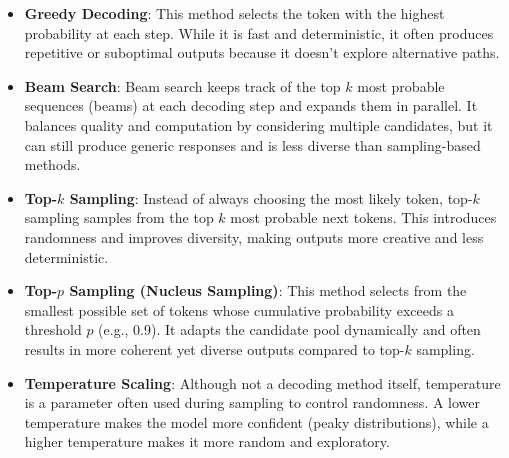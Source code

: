 \begin{itemize}
	\item \textbf{Greedy Decoding}: This method selects the token with the highest probability at each step. While it is fast and deterministic, it often produces repetitive or suboptimal outputs because it doesn't explore alternative paths.
	\item \textbf{Beam Search}: Beam search keeps track of the top \(k\) most probable sequences (beams) at each decoding step and expands them in parallel. It balances quality and computation by considering multiple candidates, but it can still produce generic responses and is less diverse than sampling-based methods.
	\item \textbf{Top-\(k\) Sampling}: Instead of always choosing the most likely token, top-\(k\) sampling samples from the top \(k\) most probable next tokens. This introduces randomness and improves diversity, making outputs more creative and less deterministic.
	\item \textbf{Top-\(p\) Sampling (Nucleus Sampling)}: This method selects from the smallest possible set of tokens whose cumulative probability exceeds a threshold \(p\) (e.g., 0.9). It adapts the candidate pool dynamically and often results in more coherent yet diverse outputs compared to top-\(k\) sampling.
	\item \textbf{Temperature Scaling}: Although not a decoding method itself, temperature is a parameter often used during sampling to control randomness. A lower temperature makes the model more confident (peaky distributions), while a higher temperature makes it more random and exploratory.
\end{itemize}

